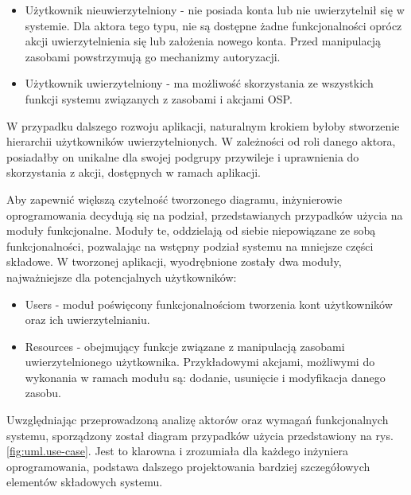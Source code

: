 \begin{itemize}
    \item Użytkownik nieuwierzytelniony - nie posiada konta lub nie uwierzytelnił się w systemie. Dla aktora tego typu, nie są dostępne żadne funkcjonalności oprócz akcji uwierzytelnienia się lub założenia nowego konta. Przed manipulacją zasobami powstrzymują go mechanizmy autoryzacji.
    \item Użytkownik uwierzytelniony - ma możliwość skorzystania ze wszystkich funkcji systemu związanych z zasobami i akcjami OSP.
\end{itemize}

W przypadku dalszego rozwoju aplikacji, naturalnym krokiem byłoby stworzenie hierarchii użytkowników uwierzytelnionych. W zależności od roli danego aktora, posiadałby on unikalne dla swojej podgrupy przywileje i uprawnienia do skorzystania z akcji, dostępnych w ramach aplikacji.

Aby zapewnić większą czytelność tworzonego diagramu, inżynierowie oprogramowania decydują się na podział, przedstawianych przypadków użycia na moduły funkcjonalne. Moduły te, oddzielają od siebie niepowiązane ze sobą funkcjonalności, pozwalając na wstępny podział systemu na mniejsze części składowe. W tworzonej aplikacji, wyodrębnione zostały dwa moduły, najważniejsze dla potencjalnych użytkowników:

\begin{itemize}
    \item Users - moduł poświęcony funkcjonalnościom tworzenia kont użytkowników oraz ich uwierzytelnianiu.
    \item Resources - obejmujący funkcje związane z manipulacją zasobami uwierzytelnionego użytkownika. Przykładowymi akcjami, możliwymi do wykonania w ramach modułu są: dodanie, usunięcie i modyfikacja danego zasobu.
\end{itemize}

Uwzględniając przeprowadzoną analizę aktorów oraz wymagań funkcjonalnych systemu, sporządzony został diagram przypadków użycia przedstawiony na rys. \ref{fig:uml.use-case}. Jest to klarowna i zrozumiała dla każdego inżyniera oprogramowania, podstawa dalszego projektowania bardziej szczegółowych elementów składowych systemu.

